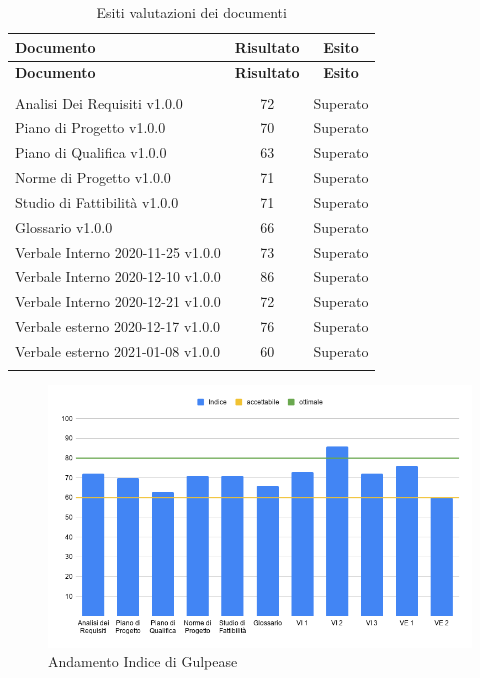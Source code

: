 \documentclass[../piano_di_qualifica.tex]{subfiles}
\begin{document}
\begin{center}
	\begin{longtable}{|l|c|c|}
		\hline
		\rowcolor{lightgray}
		\textbf{Documento}                 & \textbf{Risultato} & \textbf{Esito} \\
		\hline
		\endfirsthead

		\hline
		\rowcolor{lightgray}
		\textbf{Documento}                 & \textbf{Risultato} & \textbf{Esito} \\
		\hline
		\endhead

		\hline
		\rowcolor{white}
		\multicolumn{3}{|c|}{\emph{Continua alla pagina successiva...}} \\
		\hline
		\endfoot
		\endlastfoot

		Analisi Dei Requisiti v1.0.0       & 72                 & Superato       \\
		Piano di Progetto v1.0.0           & 70                 & Superato       \\
		Piano di Qualifica v1.0.0          & 63                 & Superato       \\
		Norme di Progetto v1.0.0           & 71                 & Superato       \\
		Studio di Fattibilità v1.0.0       & 71                 & Superato       \\
		Glossario v1.0.0                   & 66                 & Superato       \\
		Verbale Interno 2020-11-25 v1.0.0  & 73                 & Superato       \\
		Verbale Interno 2020-12-10 v1.0.0  & 86                 & Superato       \\
		Verbale Interno 2020-12-21 v1.0.0  & 72                 & Superato       \\
		Verbale esterno 2020-12-17  v1.0.0 & 76                 & Superato       \\
		Verbale esterno 2021-01-08  v1.0.0 & 60                 & Superato       \\
		\hline
		\rowcolor{white}
		\caption{Esiti valutazioni dei documenti}
	\end{longtable}
\end{center}

\begin{figure}[H]
	\centering
	\includegraphics[width=14cm]{img/media_gul_RR.png}
	\caption{Andamento Indice di Gulpease}
\end{figure}
\end{document}
